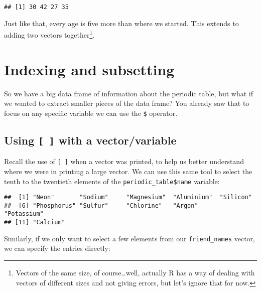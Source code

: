 \documentclass[]{tufte-book}
\newenvironment{Shaded}{\begin{snugshade}}{\end{snugshade}}
\newcommand{\DecValTok}[1]{\textcolor[rgb]{0.00,0.00,0.81}{#1}}
\newcommand{\NormalTok}[1]{#1}
\newcommand{\OperatorTok}[1]{\textcolor[rgb]{0.81,0.36,0.00}{\textbf{#1}}}
\begin{document}
\begin{verbatim}
## [1] 30 42 27 35
\end{verbatim}

Just like that, every age is five more than where we started. This extends to adding two vectors together\footnote{Vectors of the same size, of course\ldots well, actually R has a way of dealing with vectors of different sizes and not giving errors, but let's ignore that for now.}.

\hypertarget{index-sub}{%
\section{Indexing and subsetting}\label{index-sub}}

So we have a big data frame of information about the periodic table, but what if we wanted to extract smaller pieces of the data frame? You already saw that to focus on any specific variable we can use the \texttt{\$} operator.

\hypertarget{using-with-a-vectorvariable}{%
\subsection{\texorpdfstring{Using \texttt{{[}\ {]}} with a vector/variable}{Using {[} {]} with a vector/variable}}\label{using-with-a-vectorvariable}}

Recall the use of \texttt{{[}\ {]}} when a vector was printed, to help us better understand where we were in printing a large vector. We can use this same tool to select the tenth to the twentieth elements of the \texttt{periodic\_table\$name} variable:

\begin{Shaded}
\end{Shaded}

\begin{verbatim}
##  [1] "Neon"       "Sodium"     "Magnesium"  "Aluminium"  "Silicon"   
##  [6] "Phosphorus" "Sulfur"     "Chlorine"   "Argon"      "Potassium" 
## [11] "Calcium"
\end{verbatim}

Similarly, if we only want to select a few elements from our \texttt{friend\_names} vector, we can specify the entries directly:
\end{document}
